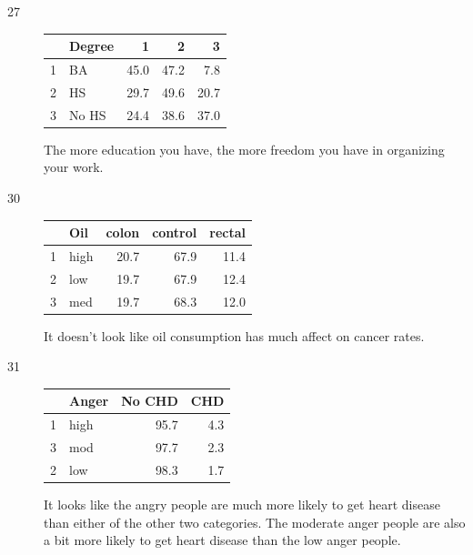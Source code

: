 \documentclass[letterpaper, landscape]{exam}
\begin{document}
\begin{description}
    \item[27]
      \begin{table}[H]
        \centering
        \begin{tabular}{rlrrr}
          \toprule
            & Degree & 1    & 2    & 3     \\
          \midrule
          1 & BA     & 45.0 & 47.2 & 7.8  \\
          2 & HS     & 29.7 & 49.6 & 20.7 \\
          3 & No HS  & 24.4 & 38.6 & 37.0 \\
          \bottomrule
        \end{tabular}
      \end{table}

      The more education you have, the more freedom you have in organizing your work.

    \item[30]
      \begin{table}[H]
        \centering
        \begin{tabular}{rlrrr}
          \toprule
            & Oil  & colon & control & rectal \\
          \midrule
          1 & high & 20.7  & 67.9    & 11.4 \\
          2 & low  & 19.7  & 67.9    & 12.4 \\
          3 & med  & 19.7  & 68.3    & 12.0 \\
          \bottomrule
        \end{tabular}
      \end{table}

      It doesn't look like oil consumption has much affect on cancer rates.

    \item[31]
      \begin{table}[H]
        \centering
        \begin{tabular}{rlrr}
          \toprule
            & Anger & No CHD & CHD \\
          \midrule
          1 & high  & 95.7   & 4.3 \\
          3 & mod   & 97.7   & 2.3 \\
          2 & low   & 98.3   & 1.7 \\
          \bottomrule
        \end{tabular}
      \end{table}

      It looks like the angry people are much more likely to get heart disease than
      either of the other two categories.  The moderate anger people are also a bit
      more likely to get heart disease than the low anger people.

  \end{description}
\end{document}
